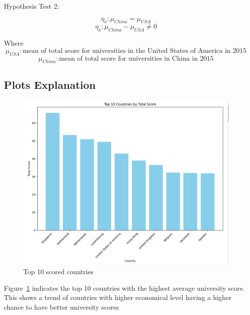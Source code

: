 \documentclass[a4paper]{article}
\begin{document}
Hypothesis Test 2:

$$\eta_o: \mu_{China} = \mu_{USA}$$
$$\eta_a: \mu_{China} - \mu_{USA} \neq 0$$

Where\newline 
$$\mu_{USA}: \text{mean of total score for universities in the United States of America in 2015}$$
$$\mu_{China}: \text{mean of total score for universities in China in 2015}$$

\subsection* {Plots Explanation}

\begin{figure}[h]
    \centering
    \includegraphics[scale=0.6]{images/WPlot1.png}
    \caption{Top 10 scored countries}
    \label{fig:fig:1}
\end{figure}
\FloatBarrier
Figure~\ref{fig:fig:1} indicates the top 10 countries with the highest average university score. This shows a trend of countries with higher economical level having a higher chance to have better university scores
\end{document}
